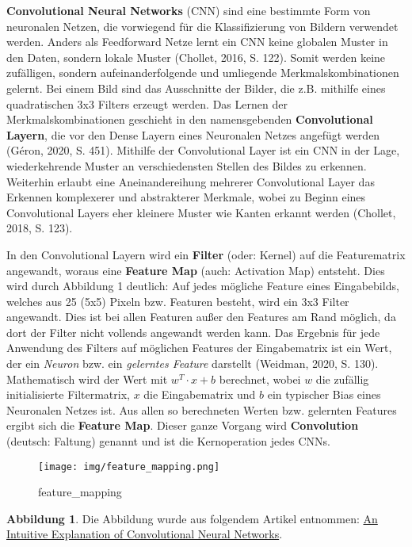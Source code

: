\documentclass[11pt]{article}
\begin{document}
\textbf{Convolutional Neural Networks} (CNN) sind eine bestimmte Form
von neuronalen Netzen, die vorwiegend für die Klassifizierung von
Bildern verwendet werden. Anders als Feedforward Netze lernt ein CNN
keine globalen Muster in den Daten, sondern lokale Muster (Chollet,
2016, S. 122). Somit werden keine zufälligen, sondern
aufeinanderfolgende und umliegende Merkmalskombinationen gelernt. Bei
einem Bild sind das Ausschnitte der Bilder, die z.B. mithilfe eines
quadratischen 3x3 Filters erzeugt werden. Das Lernen der
Merkmalskombinationen geschieht in den namensgebenden
\textbf{Convolutional Layern}, die vor den Dense Layern eines Neuronalen
Netzes angefügt werden (Géron, 2020, S. 451). Mithilfe der Convolutional
Layer ist ein CNN in der Lage, wiederkehrende Muster an verschiedensten
Stellen des Bildes zu erkennen. Weiterhin erlaubt eine Aneinandereihung
mehrerer Convolutional Layer das Erkennen komplexerer und abstrakterer
Merkmale, wobei zu Beginn eines Convolutional Layers eher kleinere
Muster wie Kanten erkannt werden (Chollet, 2018, S. 123).

In den Convolutional Layern wird ein \textbf{Filter} (oder: Kernel) auf
die Featurematrix angewandt, woraus eine \textbf{Feature Map} (auch:
Activation Map) entsteht. Dies wird durch Abbildung 1 deutlich: Auf
jedes mögliche Feature eines Eingabebilds, welches aus 25 (5x5) Pixeln
bzw. Featuren besteht, wird ein 3x3 Filter angewandt. Dies ist bei allen
Featuren außer den Features am Rand möglich, da dort der Filter nicht
vollends angewandt werden kann. Das Ergebnis für jede Anwendung des
Filters auf möglichen Features der Eingabematrix ist ein Wert, der ein
\emph{Neuron} bzw. ein \emph{gelerntes Feature} darstellt (Weidman,
2020, S. 130). Mathematisch wird der Wert mit \(w^T \cdot x + b\)
berechnet, wobei \(w\) die zufällig initialisierte Filtermatrix, \(x\)
die Eingabematrix und \(b\) ein typischer Bias eines Neuronalen Netzes
ist. Aus allen so berechneten Werten bzw. gelernten Features ergibt sich
die \textbf{Feature Map}. Dieser ganze Vorgang wird \textbf{Convolution}
(deutsch: Faltung) genannt und ist die Kernoperation jedes CNNs.

\begin{figure}
\centering
\texttt{[image: img/feature\_mapping.png]}
\caption{feature\_mapping}
\end{figure}

\textbf{Abbildung 1}. Die Abbildung wurde aus folgendem Artikel
entnommen:
\href{https://ujjwalkarn.me/2016/08/11/intuitive-explanation-convnets/}{An
Intuitive Explanation of Convolutional Neural Networks}.
\end{document}

